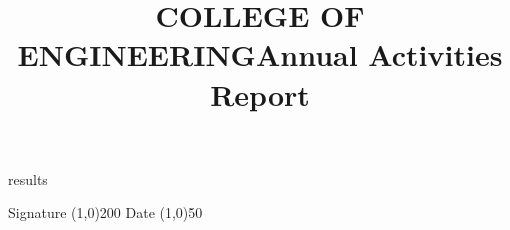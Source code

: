 \documentclass{article}
\begin{document}
\title{COLLEGE OF ENGINEERING\newline Annual Activities Report}
\date{}
\maketitle
{{results}}
\vspace{2in}
\begin{center}
Signature
\line(1,0){200} 
\hspace{2em}
Date
\line(1,0){50}
\end{center}
\end{document}

